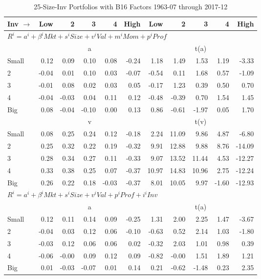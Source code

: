 
\begin{table}[!ht]
\footnotesize
\centering
\caption{25-Size-Inv Portfolios with B16 Factors 1963-07 through 2017-12}
\begin{tabular}{lrrrrrrrrrr}
  \toprule
    
    Inv $\rightarrow$ & Low & 2 & 3 & 4 & High & Low & 2 & 3 & 4 & High  \\ 
  \midrule
  \multicolumn{11}{l}{$R^i=a^i+\beta^iMkt+s^iSize+v^iVal+m^iMom+p^iProf$}  \\
  
     & \multicolumn{5}{c}{a} & \multicolumn{5}{c}{t(a)}   \\
     \cmidrule(r){2-6} \cmidrule(r){7-11} 
    Small  & 0.12  & 0.09  & 0.10  & 0.08  & -0.24  & 1.18  & 1.49  & 1.53  & 1.19  & -3.33   \\
    2  & -0.04  & 0.01  & 0.10  & 0.03  & -0.07  & -0.54  & 0.11  & 1.68  & 0.57  & -1.09   \\
    3  & -0.01  & 0.08  & 0.02  & 0.03  & 0.05  & -0.17  & 1.23  & 0.39  & 0.50  & 0.70   \\
    4  & -0.04  & -0.03  & 0.04  & 0.11  & 0.12  & -0.48  & -0.39  & 0.70  & 1.54  & 1.45   \\
    Big  & 0.08  & -0.04  & -0.10  & 0.00  & 0.13  & 0.86  & -0.61  & -1.97  & 0.05  & 1.70   \\
  
     & \multicolumn{5}{c}{v} & \multicolumn{5}{c}{t(v)}   \\
     \cmidrule(r){2-6} \cmidrule(r){7-11} 
    Small  & 0.08  & 0.25  & 0.24  & 0.12  & -0.18  & 2.24  & 11.09  & 9.86  & 4.87  & -6.80   \\
    2  & 0.25  & 0.32  & 0.22  & 0.19  & -0.32  & 9.91  & 12.88  & 9.88  & 8.76  & -14.09   \\
    3  & 0.28  & 0.34  & 0.27  & 0.11  & -0.33  & 9.07  & 13.52  & 11.44  & 4.53  & -12.27   \\
    4  & 0.33  & 0.38  & 0.25  & 0.07  & -0.37  & 10.97  & 14.83  & 10.96  & 2.75  & -12.24   \\
    Big  & 0.26  & 0.22  & 0.18  & -0.03  & -0.37  & 8.01  & 10.05  & 9.97  & -1.60  & -12.93   \\

  \midrule
  \multicolumn{11}{l}{$R^i=a^i+\beta^iMkt+s^iSize+v^iVal+p^iProf+i^iInv$}  \\

     & \multicolumn{5}{c}{a} & \multicolumn{5}{c}{t(a)}   \\
     \cmidrule(r){2-6} \cmidrule(r){7-11} 
    Small  & 0.12  & 0.11  & 0.14  & 0.09  & -0.25  & 1.31  & 2.00  & 2.25  & 1.47  & -3.67   \\
    2  & -0.04  & 0.03  & 0.12  & 0.06  & -0.10  & -0.63  & 0.52  & 2.14  & 1.03  & -1.80   \\
    3  & -0.03  & 0.12  & 0.06  & 0.06  & 0.02  & -0.32  & 2.03  & 1.01  & 0.98  & 0.39   \\
    4  & -0.06  & -0.00  & 0.09  & 0.12  & 0.09  & -0.82  & -0.00  & 1.51  & 1.89  & 1.21   \\
    Big  & 0.01  & -0.03  & -0.07  & 0.01  & 0.14  & 0.21  & -0.62  & -1.48  & 0.23  & 2.35   \\


\end{tabular}
\end{table}
